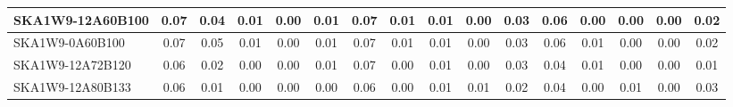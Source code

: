 \begin{table}[H]
{{\begin{tabular}{|lccccc||ccccc||ccccc|}
SKA1W9-12A60B100 & 0.07 \cellcolor{blue!60.00} & 0.04 \cellcolor{red!49.50} & 0.01 \cellcolor{green!60.00} & 0.00 \cellcolor{orange!18.00} & 0.01 \cellcolor{purple!60.00} & 0.07 \cellcolor{blue!60.00} & 0.01 \cellcolor{red!39.00} & 0.01 \cellcolor{green!18.00} & 0.00 \cellcolor{orange!18.00} & 0.03 \cellcolor{purple!60.00} & 0.06 \cellcolor{blue!46.00} & 0.00 \cellcolor{red!18.00} & 0.00 \cellcolor{green!18.00} & 0.00 \cellcolor{orange!18.00} & 0.02 \cellcolor{purple!28.50}\\ \hline 
SKA1W9-0A60B100 & 0.07 \cellcolor{blue!60.00} & 0.05 \cellcolor{red!60.00} & 0.01 \cellcolor{green!60.00} & 0.00 \cellcolor{orange!18.00} & 0.01 \cellcolor{purple!60.00} & 0.07 \cellcolor{blue!60.00} & 0.01 \cellcolor{red!39.00} & 0.01 \cellcolor{green!18.00} & 0.00 \cellcolor{orange!18.00} & 0.03 \cellcolor{purple!60.00} & 0.06 \cellcolor{blue!46.00} & 0.01 \cellcolor{red!60.00} & 0.00 \cellcolor{green!18.00} & 0.00 \cellcolor{orange!18.00} & 0.02 \cellcolor{purple!28.50}\\ \hline 
SKA1W9-12A72B120 & 0.06 \cellcolor{blue!18.00} & 0.02 \cellcolor{red!28.50} & 0.00 \cellcolor{green!18.00} & 0.00 \cellcolor{orange!18.00} & 0.01 \cellcolor{purple!60.00} & 0.07 \cellcolor{blue!60.00} & 0.00 \cellcolor{red!18.00} & 0.01 \cellcolor{green!18.00} & 0.00 \cellcolor{orange!18.00} & 0.03 \cellcolor{purple!60.00} & 0.04 \cellcolor{blue!18.00} & 0.01 \cellcolor{red!60.00} & 0.00 \cellcolor{green!18.00} & 0.00 \cellcolor{orange!18.00} & 0.01 \cellcolor{purple!18.00}\\ \hline 
SKA1W9-12A80B133 & 0.06 \cellcolor{blue!18.00} & 0.01 \cellcolor{red!18.00} & 0.00 \cellcolor{green!18.00} & 0.00 \cellcolor{orange!18.00} & 0.00 \cellcolor{purple!18.00} & 0.06 \cellcolor{blue!18.00} & 0.00 \cellcolor{red!18.00} & 0.01 \cellcolor{green!18.00} & 0.01 \cellcolor{orange!60.00} & 0.02 \cellcolor{purple!18.00} & 0.04 \cellcolor{blue!18.00} & 0.00 \cellcolor{red!18.00} & 0.01 \cellcolor{green!60.00} & 0.00 \cellcolor{orange!18.00} & 0.03 \cellcolor{purple!39.00}\\ \hline 
\end{tabular}}
\vspace{-0.300000cm}
\hspace{1cm} 
}
\end{table}
